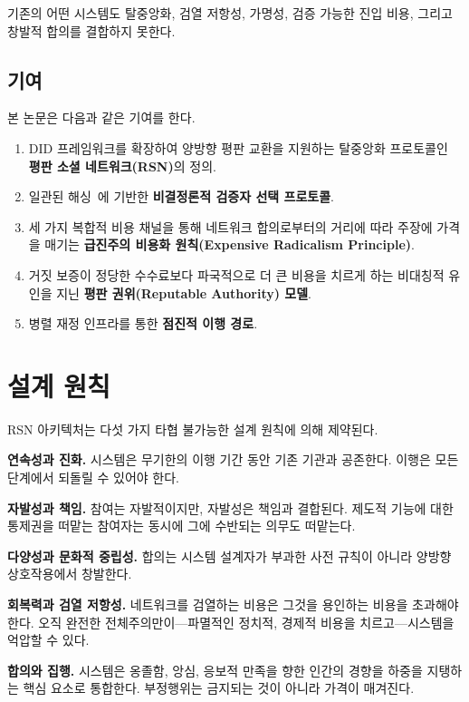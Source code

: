 \documentclass[11pt,a4paper,twocolumn]{article}
\begin{document}
기존의 어떤 시스템도 탈중앙화, 검열 저항성, 가명성, 검증 가능한 진입 비용, 그리고 창발적 합의를 결합하지 못한다.

\subsection{기여}

본 논문은 다음과 같은 기여를 한다.
\begin{enumerate}[nosep]
\item DID 프레임워크를 확장하여 양방향 평판 교환을 지원하는 탈중앙화 프로토콜인 \textbf{평판 소셜 네트워크(RSN)}의 정의.
\item 일관된 해싱~\cite{karger1997}에 기반한 \textbf{비결정론적 검증자 선택 프로토콜}.
\item 세 가지 복합적 비용 채널을 통해 네트워크 합의로부터의 거리에 따라 주장에 가격을 매기는 \textbf{급진주의 비용화 원칙(Expensive Radicalism Principle)}.
\item 거짓 보증이 정당한 수수료보다 파국적으로 더 큰 비용을 치르게 하는 비대칭적 유인을 지닌 \textbf{평판 권위(Reputable Authority) 모델}.
\item 병렬 재정 인프라를 통한 \textbf{점진적 이행 경로}.
\end{enumerate}

\section{설계 원칙}

RSN 아키텍처는 다섯 가지 타협 불가능한 설계 원칙에 의해 제약된다.

\textbf{연속성과 진화.} 시스템은 무기한의 이행 기간 동안 기존 기관과 공존한다. 이행은 모든 단계에서 되돌릴 수 있어야 한다.

\textbf{자발성과 책임.} 참여는 자발적이지만, 자발성은 책임과 결합된다. 제도적 기능에 대한 통제권을 떠맡는 참여자는 동시에 그에 수반되는 의무도 떠맡는다.

\textbf{다양성과 문화적 중립성.} 합의는 시스템 설계자가 부과한 사전 규칙이 아니라 양방향 상호작용에서 창발한다.

\textbf{회복력과 검열 저항성.} 네트워크를 검열하는 비용은 그것을 용인하는 비용을 초과해야 한다. 오직 완전한 전체주의만이---파멸적인 정치적, 경제적 비용을 치르고---시스템을 억압할 수 있다.

\textbf{합의와 집행.} 시스템은 옹졸함, 앙심, 응보적 만족을 향한 인간의 경향을 하중을 지탱하는 핵심 요소로 통합한다. 부정행위는 금지되는 것이 아니라 가격이 매겨진다.
\end{document}
